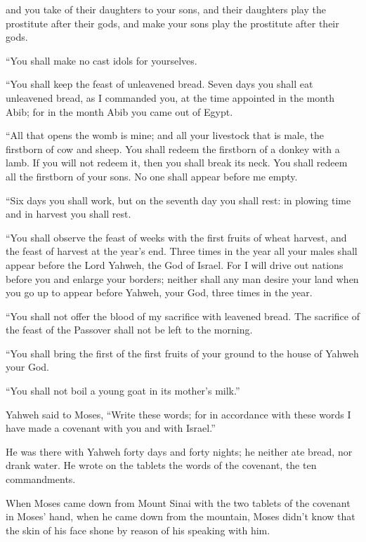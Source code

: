 {and you take of their daughters to your sons, and their daughters play the prostitute after their gods, and make your sons play the prostitute after their gods.
\par }{\PP {}“You shall make no cast idols for yourselves.
\par }{\PP {}“You shall keep the feast of unleavened bread. Seven days you shall eat unleavened bread, as I commanded you, at the time appointed in the month Abib; for in the month Abib you came out of Egypt.
\par }{\PP {}“All that opens the womb is mine; and all your livestock that is male, the firstborn of cow and sheep.
You shall redeem the firstborn of a donkey with a lamb. If you will not redeem it, then you shall break its neck. You shall redeem all the firstborn of your sons. No one shall appear before me empty.
\par }{\PP {}“Six days you shall work, but on the seventh day you shall rest: in plowing time and in harvest you shall rest.
\par }{\PP {}“You shall observe the feast of weeks with the first fruits of wheat harvest, and the feast of harvest at the year’s end.
Three times in the year all your males shall appear before the Lord Yahweh, the God of Israel.
For I will drive out nations before you and enlarge your borders; neither shall any man desire your land when you go up to appear before Yahweh, your God, three times in the year.
\par }{\PP {}“You shall not offer the blood of my sacrifice with leavened bread. The sacrifice of the feast of the Passover shall not be left to the morning.
\par }{\PP {}“You shall bring the first of the first fruits of your ground to the house of Yahweh your God.
\par }{\PP “You shall not boil a young goat in its mother’s milk.”
\par }{\PP {}Yahweh said to Moses, “Write these words; for in accordance with these words I have made a covenant with you and with Israel.”
\par }{\PP {}He was there with Yahweh forty days and forty nights; he neither ate bread, nor drank water. He wrote on the tablets the words of the covenant, the ten commandments.
\par }{\PP {}When Moses came down from Mount Sinai with the two tablets of the covenant in Moses’ hand, when he came down from the mountain, Moses didn’t know that the skin of his face shone by reason of his speaking with him.
}
